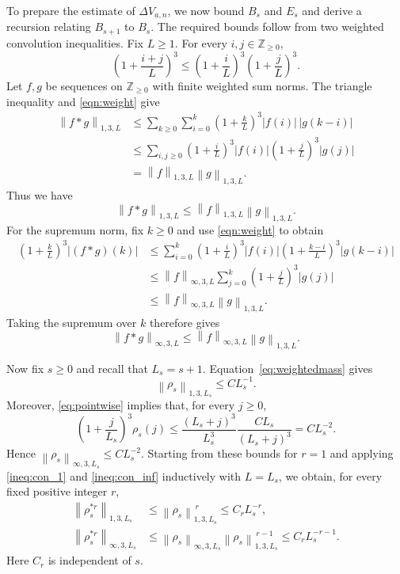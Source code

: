 \documentclass[11pt,letterpaper,reqno]{amsart}
\numberwithin{equation}{section}
\theoremstyle{plain}
\theoremstyle{remark}
\newcommand{\Zp}{\mathbb Z_{\ge0}}
\newcommand{\norm}[1]{\left\lVert#1\right\rVert}
\begin{document}
To prepare the estimate of $\Delta V_{a,n}$, we now bound $B_s$ and $E_s$
and derive a recursion relating $B_{s+1}$ to $B_s$.
The required bounds follow from two weighted convolution inequalities.
Fix $L\ge1$.
For every $i,j\in\Zp$,
\begin{equation}\label{eqn:weight}
 \left(1+\frac{i+j}{L}\right)^3
 \le
 \left(1+\frac iL\right)^3
 \left(1+\frac jL\right)^3.
\end{equation}
Let $f,g$ be sequences on $\Zp$ with finite weighted sum norms.
The triangle inequality and \eqref{eqn:weight} give
\[
 \begin{aligned}
 \norm{f*g}_{1,3,L}
 &\le
 \sum_{k\ge0}\sum_{i=0}^{k}
 \left(1+\frac kL\right)^3
 |f(i)|\,|g(k-i)|\\
 &\le
 \sum_{i,j\ge0}
 \left(1+\frac iL\right)^3|f(i)|
 \left(1+\frac jL\right)^3|g(j)|\\
 &=\norm f_{1,3,L}\norm g_{1,3,L}.
 \end{aligned}
\]
Thus we have
\begin{equation}\label{ineq:con_1}
 \norm{f*g}_{1,3,L}
 \le \norm f_{1,3,L}\norm g_{1,3,L}.
\end{equation}
For the supremum norm, fix $k\ge0$ and use \eqref{eqn:weight} to obtain
\[
 \begin{aligned}
 \left(1+\frac kL\right)^3|(f*g)(k)|
 &\le
 \sum_{i=0}^{k}
 \left(1+\frac iL\right)^3|f(i)|
 \left(1+\frac{k-i}{L}\right)^3|g(k-i)|\\
 &\le
 \norm f_{\infty,3,L}
 \sum_{j=0}^{k}\left(1+\frac jL\right)^3|g(j)|\\
 &\le
 \norm f_{\infty,3,L}\norm g_{1,3,L}.
 \end{aligned}
\]
Taking the supremum over $k$ therefore gives
\begin{equation}\label{ineq:con_inf}
 \norm{f*g}_{\infty,3,L}
 \le \norm f_{\infty,3,L}\norm g_{1,3,L}.
\end{equation}

Now fix $s\ge0$ and recall that $L_s=s+1$.
Equation~\eqref{eq:weightedmass} gives
\[
 \norm{\rho_s}_{1,3,L_s}\le CL_s^{-1}.
\]
Moreover, \eqref{eq:pointwise} implies that, for every $j\ge0$,
\[
 \left(1+\frac j{L_s}\right)^3\rho_s(j)
 \le
 \frac{(L_s+j)^3}{L_s^3}
 \frac{CL_s}{(L_s+j)^3}
 =CL_s^{-2}.
\]
Hence $\norm{\rho_s}_{\infty,3,L_s}\le CL_s^{-2}$.
Starting from these bounds for $r=1$ and applying
\eqref{ineq:con_1} and \eqref{ineq:con_inf} inductively with $L=L_s$,
we obtain, for every fixed positive integer $r$,
\begin{equation}\label{eq:convnorms}
 \begin{aligned}
 \norm{\rho_s^{*r}}_{1,3,L_s}
 &\le \norm{\rho_s}_{1,3,L_s}^{\,r}
 \le C_rL_s^{-r},\\
 \norm{\rho_s^{*r}}_{\infty,3,L_s}
 &\le
 \norm{\rho_s}_{\infty,3,L_s}
 \norm{\rho_s}_{1,3,L_s}^{\,r-1}
 \le C_rL_s^{-r-1}.
 \end{aligned}
\end{equation}
Here $C_r$ is independent of $s$.
\end{document}

